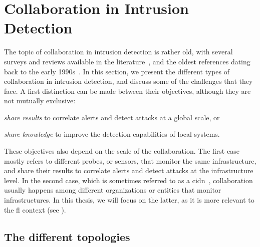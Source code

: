 \section{Collaboration in Intrusion Detection\label{sec:bg.collab}}

The topic of collaboration in intrusion detection is rather old, with several surveys and reviews available in the literature~\cite{zhou_surveycoordinatedattacks_2010,elshoush_Alertcorrelationcollaborative_2011,vasilomanolakis_TaxonomySurveyCollaborative_2015,meng_CollaborativeSecuritySurvey_2015,folino_Ensemblebasedcollaborative_2016,li_SurveyingTrustBasedCollaborative_2022}, and the oldest references dating back to the early 1990s~\cite{snapp_DIDSdistributedintrusion_1992}.
In this section, we present the different types of collaboration in intrusion detection, and discuss some of the challenges that they face.
A first distinction can be made between their objectives, although they are not mutually exclusive:
\begin{enumerate*}[(i)]
  \item \emph{share results} to correlate alerts and detect attacks at a global scale, or
  \item \emph{share knowledge} to improve the detection capabilities of local systems.
\end{enumerate*}

These objectives also depend on the scale of the collaboration.
The first case mostly refers to different probes, or sensors, that monitor the same infrastructure, and share their results to correlate alerts and detect attacks at the infrastructure level.
In the second case, which is sometimes referred to as a \gls{cidn}~\cite{li_SurveyingTrustBasedCollaborative_2022}, collaboration usually happens among different organizations or entities that monitor infrastructures.
In this thesis, we will focus on the latter, as it is more relevant to the \gls{fl} context (see ).


\subsection{The different topologies\label{sec:bg.collab.topo}}

